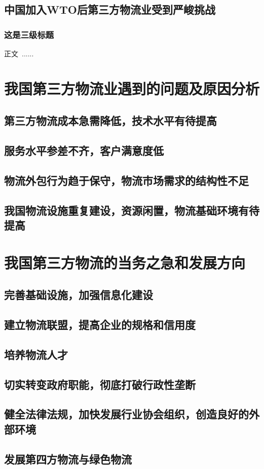 \documentclass[UTF-8]{CUFEpaper}
\begin{document}
\subsection{中国加入WTO后第三方物流业受到严峻挑战}
\subsubsection{这是三级标题}
正文\ ......


\section{我国第三方物流业遇到的问题及原因分析}
\subsection{第三方物流成本急需降低，技术水平有待提高}
\subsection{服务水平参差不齐，客户满意度低}
\subsection{物流外包行为趋于保守，物流市场需求的结构性不足}
\subsection{我国物流设施重复建设，资源闲置，物流基础环境有待提高}

\section{我国第三方物流的当务之急和发展方向}
\subsection{完善基础设施，加强信息化建设}
\subsection{建立物流联盟，提高企业的规格和信用度}
\subsection{培养物流人才}
\subsection{切实转变政府职能，彻底打破行政性垄断}
\subsection{健全法律法规，加快发展行业协会组织，创造良好的外部环境}
\subsection{发展第四方物流与绿色物流}
\end{document}
